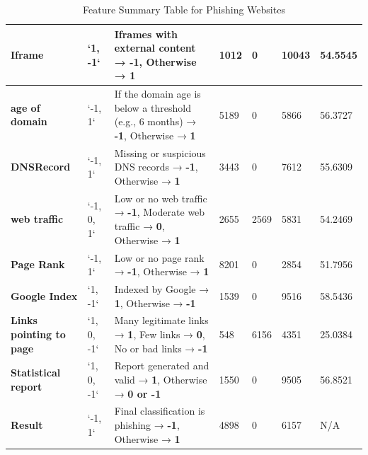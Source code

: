 \documentclass{sigkddExp}
\begin{document}
\begin{table}[h!]
\begin{tabular}{|p{3cm}|l|p{8cm}|l|l|l|l|}
\hline
\textbf{Iframe} & `1, -1` & Iframes with external content → \textbf{-1}, Otherwise → \textbf{1} & 1012 & 0 & 10043 & 54.5545 \\
\hline
\textbf{age of domain} & `-1, 1` & If the domain age is below a threshold (e.g., 6 months) → \textbf{-1}, Otherwise → \textbf{1} & 5189 & 0 & 5866 & 56.3727 \\
\hline
\textbf{DNSRecord} & `-1, 1` & Missing or suspicious DNS records → \textbf{-1}, Otherwise → \textbf{1} & 3443 & 0 & 7612 & 55.6309 \\
\hline
\textbf{web traffic} & `-1, 0, 1` & Low or no web traffic → \textbf{-1}, Moderate web traffic → \textbf{0}, Otherwise → \textbf{1} & 2655 & 2569 & 5831 & 54.2469 \\
\hline
\textbf{Page Rank} & `-1, 1` & Low or no page rank → \textbf{-1}, Otherwise → \textbf{1} & 8201 & 0 & 2854 & 51.7956 \\
\hline
\textbf{Google Index} & `1, -1` & Indexed by Google → \textbf{1}, Otherwise → \textbf{-1} & 1539 & 0 & 9516 & 58.5436 \\
\hline
\textbf{Links pointing to page} & `1, 0, -1` & Many legitimate links → \textbf{1}, Few links → \textbf{0}, No or bad links → \textbf{-1} & 548 & 6156 & 4351 & 25.0384 \\
\hline
\textbf{Statistical report} & `1, 0, -1` & Report generated and valid → \textbf{1}, Otherwise → \textbf{0 or -1} & 1550 & 0 & 9505 & 56.8521 \\
\hline
\textbf{Result} & `-1, 1` & Final classification is phishing → \textbf{-1}, Otherwise → \textbf{1} & 4898 & 0 & 6157 & N/A\\
\hline
\end{tabular}
\caption{Feature Summary Table for Phishing Websites}
\label{feature-table}
\end{table}
\end{document}
